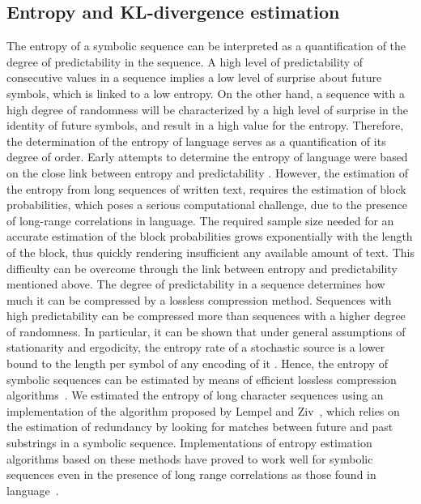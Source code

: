 \documentclass[journal]{IEEEtran}
\begin{document}
\subsection{Entropy and KL-divergence estimation}
\label{sec:entropy}


The entropy of a symbolic sequence can be interpreted as a quantification of
the
degree of predictability in the sequence. A high level of
predictability of consecutive values in a sequence implies a low level
of surprise about future
symbols, which is linked to a low entropy. On the other hand, a sequence with
a high degree of randomness will be
characterized by a high level of surprise in the identity of future symbols,
and result in a high value for the entropy.  Therefore, the determination of the
entropy
of language serves as a quantification of its degree of order.  Early attempts
to determine the
entropy of language were based on the close link between entropy and
predictability
\cite{Shannon1951}. However, the estimation of the entropy from long sequences
of written text, requires
the estimation of block probabilities, which poses a
serious computational challenge, due to the presence of long-range
correlations in language.
The required sample size needed for an accurate estimation of the block
probabilities grows exponentially
with the length of the block, thus quickly rendering insufficient any available
amount of text. This difficulty can be overcome through the
link between entropy and predictability mentioned above. The degree of
predictability in a sequence
determines how much it can be compressed by a lossless compression method.
Sequences with high predictability can be compressed more than sequences with a
higher degree of randomness.
In particular, it can be shown that under general assumptions of stationarity and
ergodicity, the entropy rate of a stochastic source is a lower bound to the
length per symbol of any encoding of it \cite{Cover2006}. Hence, the entropy
of
symbolic sequences can be estimated by means of efficient lossless
compression algorithms~\cite{Lempel1976, Wyner1989,  Schurmann1996}. We estimated the entropy of long character sequences using
an implementation of the algorithm proposed by Lempel and
Ziv~\cite{Lempel1976, Ziv1977,Ziv1978}, which
relies on the estimation of redundancy by looking for matches between future and past
substrings
in a symbolic sequence. Implementations of entropy estimation algorithms based on these methods have proved to work well
for symbolic sequences even in the presence of long range correlations as those
found in language~\cite{Schurmann1996,Kontoyiannis1998}.
\end{document}

